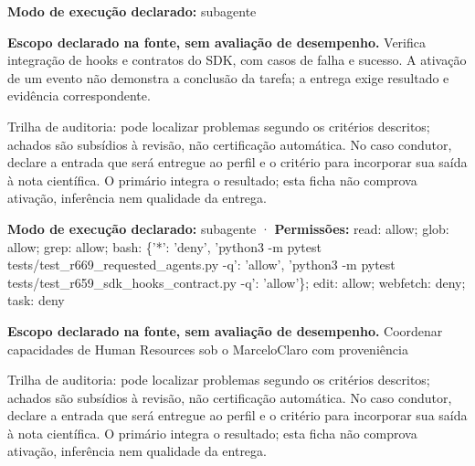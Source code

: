 \begin{arquitetura}
\textbf{Modo de execução declarado:} subagente
\end{arquitetura}


\begin{descricao}
\textbf{Escopo declarado na fonte, sem avaliação de desempenho.}
Verifica integração de hooks e contratos do SDK, com casos de falha e sucesso. A ativação de um evento não demonstra a conclusão da tarefa; a entrega exige resultado e evidência correspondente.
\end{descricao}

\begin{funcao}
Trilha de auditoria: pode localizar problemas segundo os critérios descritos; achados são subsídios à revisão, não certificação automática. No caso condutor, declare a entrada que será entregue ao perfil e o critério para incorporar sua saída à nota científica. O primário integra o resultado; esta ficha não comprova ativação, inferência nem qualidade da entrega.
\end{funcao}

\begin{arquitetura}
\textbf{Modo de execução declarado:} subagente · \textbf{Permissões:} read: allow; glob: allow; grep: allow; bash: \{'*': 'deny', 'python3 -m pytest tests/test\_r669\_requested\_agents.py -q': 'allow', 'python3 -m pytest tests/test\_r659\_sdk\_hooks\_contract.py -q': 'allow'\}; edit: allow; webfetch: deny; task: deny
\end{arquitetura}


\begin{descricao}
\textbf{Escopo declarado na fonte, sem avaliação de desempenho.}
Coordenar capacidades de Human Resources sob o MarceloClaro com proveniência
\end{descricao}

\begin{funcao}
Trilha de auditoria: pode localizar problemas segundo os critérios descritos; achados são subsídios à revisão, não certificação automática. No caso condutor, declare a entrada que será entregue ao perfil e o critério para incorporar sua saída à nota científica. O primário integra o resultado; esta ficha não comprova ativação, inferência nem qualidade da entrega.
\end{funcao}

